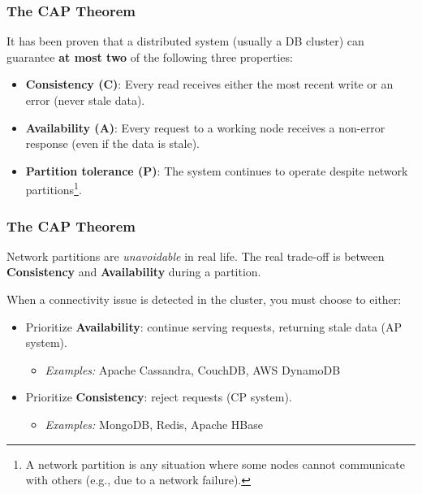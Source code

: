 \documentclass{beamer}
\begin{document}
\begin{frame}
  \frametitle{The CAP Theorem}

  It has been proven that a distributed system (usually a DB cluster) can guarantee \textbf{at most two} of the following three properties:

  \begin{itemize}
    \item \textbf{Consistency (C)}: Every read receives either the most recent write or an error (never stale data).
    \item \textbf{Availability (A)}: Every request to a working node receives a non-error response (even if the data is stale).
    \item \textbf{Partition tolerance (P)}: The system continues to operate despite network partitions\footnote{A network partition is any situation where some nodes cannot communicate with others (e.g., due to a network failure).}.
  \end{itemize}

\end{frame}

\begin{frame}
  \frametitle{The CAP Theorem}

  Network partitions are \textit{unavoidable} in real life. The real trade-off is between \textbf{Consistency} and \textbf{Availability} during a partition.
  \newline

  When a connectivity issue is detected in the cluster, you must choose to either:
  \begin{itemize}
    \item Prioritize \textbf{Availability}: continue serving requests, returning stale data (AP system).
    \begin{itemize}
      \item \textit{Examples:} Apache Cassandra, CouchDB, AWS DynamoDB
    \end{itemize}
    \item Prioritize \textbf{Consistency}: reject requests (CP system).
    \begin{itemize}
      \item \textit{Examples:} MongoDB, Redis, Apache HBase
    \end{itemize}
  \end{itemize}

\end{frame}
\end{document}
